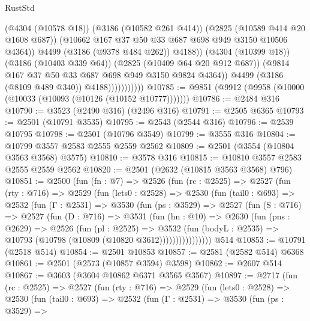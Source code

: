 \begin{lexlean}{RustStd}
\begin{coremodule}
                                  (@4304 (@10578 @18))
                                  (@3186 (@10582 @261 @414))
                                  (@2825 (@10589 @414 @20 @1608 @687))
                                  (@10662 @167 @37 @50 @33 @687 @698 @949 @3150 @10506 @4364))
                                @4499
                                (@3186 (@9378 @484 @262))
                                @4188))
                            (@4304 (@10399 @18))
                            (@3186 (@10403 @339 @64))
                            (@2825 (@10409 @64 @20 @912 @687))
                            (@9814 @167 @37 @50 @33 @687 @698 @949 @3150 @9824 @4364))
                          @4499
                          (@3186 (@8109 @489 @340))
                          @4188)))))))))))
@10785 := @9851 (@9912 (@9958 (@10000 (@10033 (@10093 (@10126 (@10152 @10777)))))))
@10786 := @2484 @316
@10790 := @3523 (@2490 @316) (@2496 @316)
@10791 := @2505 @6365
@10793 := @2501 (@10791 @3535)
@10795 := @2543 (@2544 @316)
@10796 := @2539 @10795
@10798 := @2501 (@10796 @3549)
@10799 := @3555 @316
@10804 := @10799 @3557 @2583 @2555 @2559 @2562
@10809 := @2501 (@3554 (@10804 @3563 @3568) @3575)
@10810 := @3578 @316
@10815 := @10810 @3557 @2583 @2555 @2559 @2562
@10820 := @2501 (@2632 (@10815 @3563 @3568) @796)
@10851 := @2500
    (fun (fn : @7) =>
    @2526
      (fun (rc : @2525) =>
      @2527
        (fun (rty : @716) =>
        @2529
          (fun (lets0 : @2528) =>
          @2530
            (fun (tail0 : @693) =>
            @2532
              (fun (Γ : @2531) =>
              @3530
                (fun (ps : @3529) =>
                @2527
                  (fun (S : @716) =>
                  @2527
                    (fun (D : @716) =>
                    @3531
                      (fun (hn : @10) =>
                      @2630
                        (fun (pns : @2629) =>
                        @2526
                          (fun (pl : @2525) =>
                          @3532
                            (fun (bodyL : @2535) =>
                            @10793 (@10798 (@10809 (@10820 @3612))))))))))))))))
    @514
@10853 := @10791 (@2518 @514)
@10854 := @2501 @10853
@10857 := @2581 (@2582 @514) @6368
@10861 := @2501 (@2573 (@10857 @3594) @3598)
@10862 := @2607 @514
@10867 := @3603 (@3604 @10862 @6371 @3565 @3567)
@10897 := @2717
    (fun (rc : @2525) =>
    @2527
      (fun (rty : @716) =>
      @2529
        (fun (lets0 : @2528) =>
        @2530
          (fun (tail0 : @693) =>
          @2532
            (fun (Γ : @2531) =>
            @3530
              (fun (ps : @3529) =>

\end{coremodule}
\end{lexlean}
